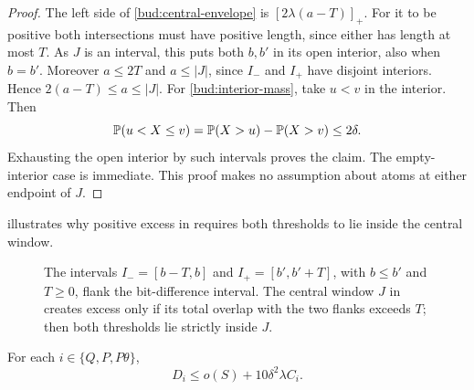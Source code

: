 \begin{proof}
The left side of \eqref{bud:central-envelope} is $[2\lambda(a-T)]_+$.
For it to be positive both intersections must have positive length,
since either has length at most $T$.  As $J$ is an interval, this
puts both $b,b'$ in its open interior, also when $b=b'$.
Moreover $a\le2T$ and $a\le|J|$, since $I_-$ and $I_+$ have disjoint
interiors.  Hence $2(a-T)\le a\le|J|$.
For \eqref{bud:interior-mass}, take $u<v$ in the interior.  Then
\[
 \mathbb P(u<X\le v)=\mathbb P(X>u)-\mathbb P(X>v)\le2\delta.
\]
Exhausting the open interior by such intervals proves the claim.
The empty-interior case is immediate.  This proof makes no
assumption about atoms at either endpoint of $J$.
\end{proof}

 illustrates why positive excess in
 requires both thresholds to lie inside the central
window.

\begin{figure}[htbp]
 \centering
 
 \caption{The intervals $I_-=[b-T,b]$ and $I_+=[b',b'+T]$, with
 $b\le b'$ and $T\ge0$, flank the bit-difference interval.
 The central window $J$ in  creates excess only
 if its total overlap with the two flanks exceeds $T$; then both
 thresholds lie strictly inside $J$.}
 \label{fig:budget-intervals}
\end{figure}

\begin{proposition}\label{bud:upper}
For each $i\in\{Q,P,P\theta\}$,
\begin{equation}\label{bud:upper-equation}
 D_i\le o(S)+10\delta^2\lambda C_i.
\end{equation}
\end{proposition}

